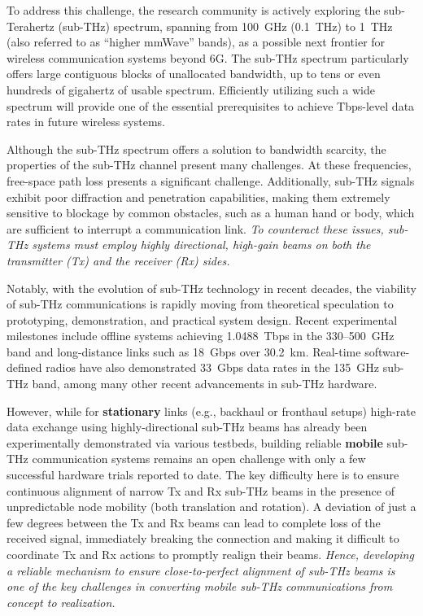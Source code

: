 \documentclass[fleqn,10pt]{wlscirep}
\begin{document}
To address this challenge, the research community is actively exploring the sub-Terahertz (sub-THz) spectrum, spanning from 100~GHz (0.1~THz) to 1~THz (also referred to as ``higher mmWave'' bands\cite{9269931}), as a possible next frontier for wireless communication systems beyond 6G\cite{Kleine-Ostmann2011, Dang2020, DeAlwis2021, Samsung2020, Rappaport2019, 10494372}. The sub-THz spectrum particularly offers large contiguous blocks of unallocated bandwidth, up to tens or even hundreds of gigahertz of usable spectrum\cite{10171235, 9766110}. Efficiently utilizing such a wide spectrum will provide one of the essential prerequisites to achieve Tbps-level data rates in future wireless systems\cite{Nokia2022}.

Although the sub-THz spectrum offers a solution to bandwidth scarcity, the properties of the sub-THz channel present many challenges. At these frequencies, free-space path loss presents a significant challenge\cite{10422992, Yu2025Research, Kleine-Ostmann2011}. Additionally, sub-THz signals exhibit poor diffraction and penetration capabilities, making them extremely sensitive to blockage by common obstacles, such as a human hand or body, which are sufficient to interrupt a communication link\cite{10494372, Jornet2023}. \emph{To counteract these issues, sub-THz systems must employ highly directional, high-gain beams on both the transmitter (Tx) and the receiver (Rx) sides\cite{Kleine-Ostmann2011}.}

Notably, with the evolution of sub-THz technology in recent decades\cite{9766110, 10579941}, the viability of sub-THz communications is rapidly moving from theoretical speculation to prototyping, demonstration, and practical system design. Recent experimental milestones include offline systems achieving 1.0488~Tbps in the 330--500~GHz band and long-distance links such as 18~Gbps over 30.2~km\cite{Yu2025Research}. Real-time software-defined radios have also demonstrated 33~Gbps data rates in the 135~GHz sub-THz band\cite{9798100,10704668}, among many other recent advancements in sub-THz hardware.

However, while for \textbf{stationary} links (e.g., backhaul or fronthaul setups) high-rate data exchange using highly-directional sub-THz beams has already been experimentally demonstrated via various testbeds\cite{Sen2023, Li2024THz84Gbps, Samsung2021_140GHz}, building reliable \textbf{mobile} sub-THz communication systems remains an open challenge with only a few successful hardware trials reported to date\cite{Han2025THz_ISAC, Petrov2023Mobile}. The key difficulty here is to ensure continuous alignment of narrow Tx and Rx sub-THz beams in the presence of unpredictable node mobility (both translation and rotation)\cite{Stepanov2021, Wang2022, Petrov2023Mobile}. A deviation of just a few degrees between the Tx and Rx beams can lead to complete loss of the received signal, immediately breaking the connection and making it difficult to coordinate Tx and Rx actions to promptly realign their beams. \emph{Hence, developing a reliable mechanism to ensure close-to-perfect alignment of sub-THz beams is one of the key challenges in converting mobile sub-THz communications from concept to realization\cite{10036372, Petrov2023Mobile, Azari2022}.}
\end{document}
